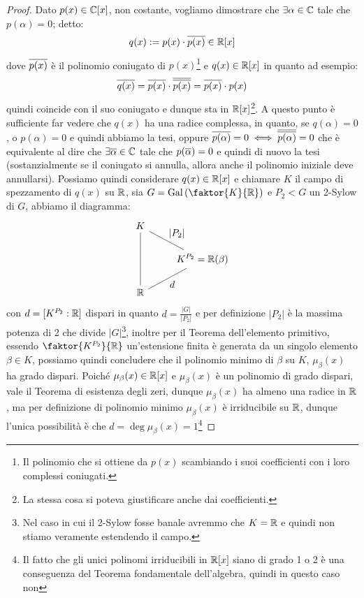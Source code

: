 \documentclass[11pt]{scrartcl}
\begin{document}
	\begin{proof}
		Dato $p(x) \in \mathbb C[x]$, non costante, vogliamo dimostrare che $\exists \alpha \in \mathbb C$ tale che $p(\alpha) = 0$; detto:
		\[ q(x) := p(x) \cdot \overline{p(x)} \in \mathbb R[x]
		\]
		dove $\overline{p(x)}$ è il polinomio coniugato di $p(x)$\footnote{Il polinomio che si ottiene da $p(x)$ scambiando i suoi coefficienti con i loro complessi coniugati.} e $q(x) \in \mathbb R[x]$ in quanto ad esempio:
		\[ \overline{q(x)} = \overline{p(x)} \cdot \overline{\overline{p(x)}} = \overline{p(x)} \cdot p(x)
		\]
		quindi coincide con il suo coniugato e dunque sta in $\mathbb R[x]$\footnote{La stessa cosa si poteva giustificare anche dai coefficienti.}. A questo punto è sufficiente far vedere che $q(x)$ ha una radice complessa, in quanto, se
		$q(\alpha) = 0$, o $p(\alpha) = 0$ e quindi abbiamo la tesi, oppure $\overline{p(\alpha)} = 0 \iff \overline{\overline{p(\alpha)}} = 0$ che è equivalente al dire che $\exists \overline \alpha \in \mathbb C$ tale che $p(\overline\alpha) = 0$ e quindi di nuovo la tesi (sostanzialmente se il 
		coniugato si annulla, allora anche il polinomio iniziale deve annullarsi). Possiamo quindi considerare $q(x) \in \mathbb R[x]$ e chiamare $K$ il campo di spezzamento di $q(x)$ su $\mathbb R$, sia $G = \Gal\left(\faktor{K}{\RR}\right)$ e $P_2 < G$ un 2-Sylow di $G$, abbiamo il diagramma:
		\[\begin{tikzcd}
			{\displaystyle K} \\
			& {\displaystyle K^{P_2} = \RR(\beta)} \\
			{\displaystyle\mathbb{R}}
			\arrow["{\displaystyle d}"', no head, from=3-1, to=2-2]
			\arrow["{\displaystyle|P_2|}", no head, from=1-1, to=2-2]
			\arrow[no head, from=3-1, to=1-1]
		\end{tikzcd}\]
		con $d = [K^{P_2} : \mathbb R]$ dispari in quanto $d = \displaystyle\frac{|G|}{|P_2|}$ e per definizione $|P_2|$ è la massima potenza di 2 che divide $|G|$\footnote{Nel caso in cui il 2-Sylow fosse banale avremmo che $K = \mathbb R$ e quindi non stiamo veramente estendendo il campo.}, inoltre per il Teorema dell'elemento primitivo, essendo $\faktor{K^{P_2}}{\RR}$ un'estensione finita è generata da un singolo elemento 
		$\beta \in K$, possiamo quindi concludere che il polinomio minimo di $\beta$ su $K$, $\mu_\beta(x)$ ha grado dispari. Poiché $\mu_\beta(x) \in \mathbb R[x]$ e $\mu_\beta(x)$ è un polinomio di grado dispari, vale il Teorema di esistenza degli zeri, dunque $\mu_\beta(x)$ ha almeno una radice in $\mathbb R$, ma 
		per definizione di polinomio minimo $\mu_\beta(x)$ è irriducibile su $\mathbb R$, dunque l'unica possibilità è che $d = \deg \mu_\beta(x) = 1$\footnote{Il fatto che gli unici polinomi irriducibili in $\mathbb R[x]$ siano di grado 1 o 2 è una conseguenza del Teorema fondamentale dell'algebra, quindi in questo caso non 
}
\end{proof}
\end{document}
